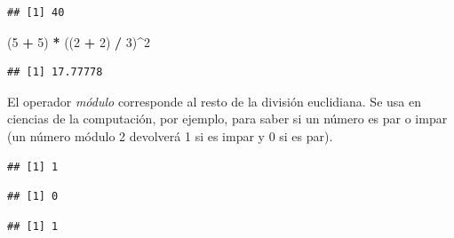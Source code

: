 \documentclass[]{book}
\newenvironment{Shaded}{\begin{snugshade}}{\end{snugshade}}
\newcommand{\DecValTok}[1]{\textcolor[rgb]{0.00,0.00,0.81}{#1}}
\newcommand{\StringTok}[1]{\textcolor[rgb]{0.31,0.60,0.02}{#1}}
\newcommand{\OperatorTok}[1]{\textcolor[rgb]{0.81,0.36,0.00}{\textbf{#1}}}
\newcommand{\NormalTok}[1]{#1}
\begin{document}
\begin{verbatim}
## [1] 40
\end{verbatim}

\begin{Shaded}
\begin{Highlighting}[]
\NormalTok{(}\DecValTok{5} \OperatorTok{+}\StringTok{ }\DecValTok{5}\NormalTok{) }\OperatorTok{*}\StringTok{ }\NormalTok{((}\DecValTok{2} \OperatorTok{+}\StringTok{ }\DecValTok{2}\NormalTok{) }\OperatorTok{/}\StringTok{ }\DecValTok{3}\NormalTok{)}\OperatorTok{^}\DecValTok{2}
\end{Highlighting}
\end{Shaded}

\begin{verbatim}
## [1] 17.77778
\end{verbatim}

El operador \emph{módulo} corresponde al resto de la división
euclidiana. Se usa en ciencias de la computación, por ejemplo, para
saber si un número es par o impar (un número módulo 2 devolverá 1 si es
impar y 0 si es par).

\begin{Shaded}
\end{Shaded}

\begin{verbatim}
## [1] 1
\end{verbatim}

\begin{Shaded}
\end{Shaded}

\begin{verbatim}
## [1] 0
\end{verbatim}

\begin{Shaded}
\end{Shaded}

\begin{verbatim}
## [1] 1
\end{verbatim}
\end{document}
